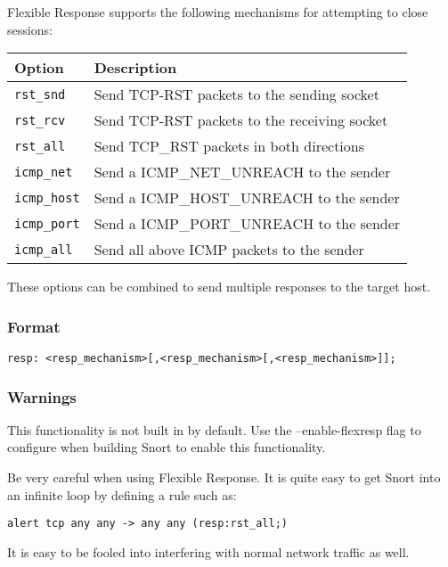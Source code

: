 \documentclass[english]{report}
\begin{document}
Flexible Response supports the following mechanisms for attempting to close
sessions:

\begin{tabular}{| l | p{5in} |}
\hline
{\bf Option} & {\bf Description}\\
\hline
\hline
\texttt{rst\_snd} &  Send TCP-RST packets to the sending socket\\
\hline 
\texttt{rst\_rcv} & Send TCP-RST packets to the receiving socket\\
\hline 
\texttt{rst\_all} & Send TCP\_RST packets in both directions\\
\hline 
\texttt{icmp\_net} & Send a ICMP\_NET\_UNREACH to the sender\\
\hline 
\texttt{icmp\_host} & Send a ICMP\_HOST\_UNREACH to the sender\\
\hline 
\texttt{icmp\_port} & Send a ICMP\_PORT\_UNREACH to the sender\\
\hline 
\texttt{icmp\_all} & Send all above ICMP packets to the sender\\
\hline
\end{tabular}

These options can be combined to send multiple responses to the target host.

\subsubsection{Format}

\begin{verbatim}
resp: <resp_mechanism>[,<resp_mechanism>[,<resp_mechanism>]];
\end{verbatim}

\subsubsection{Warnings}

This functionality is not built in by default.  Use the --enable-flexresp flag
to configure when building Snort to enable this functionality.

Be very careful when using Flexible Response. It is quite easy to get Snort
into an infinite loop by defining a rule such as:

\begin{verbatim}
alert tcp any any -> any any (resp:rst_all;)
\end{verbatim}

It is easy to be fooled into interfering with normal network traffic as well.
\end{document}
